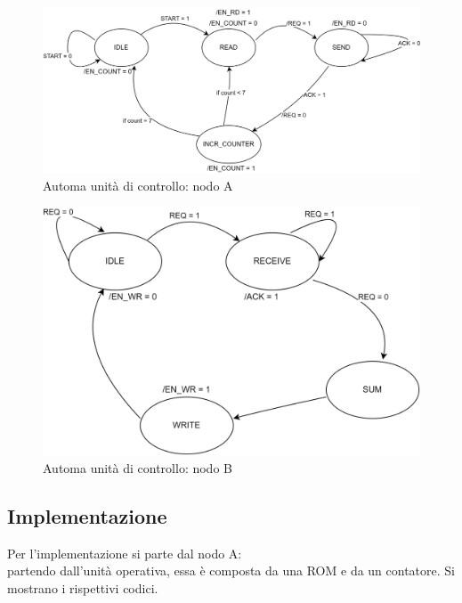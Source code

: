 \begin{figure}[H]
	\centering
	\includegraphics[width=1\textwidth]{img/preappDicembre/Preapp_automaA}
	\caption{Automa unità di controllo: nodo A}
	\label{wf_preapp} 
\end{figure}
\begin{figure}[H]
	\centering
	\includegraphics[width=1\textwidth]{img/preappDicembre/Preapp_automaB}
	\caption{Automa unità di controllo: nodo B}
	\label{wf_preapp} 
\end{figure}
\subsection{Implementazione}
Per l'implementazione si parte dal nodo A: \\
partendo dall'unità operativa, essa è composta da una ROM e da un contatore. Si mostrano i rispettivi codici.
\begin{code}
    \inputminted[frame=lines, framesep=2mm, baselinestretch=1.2, bgcolor=LightGray, fontsize=\footnotesize, linenos]{vhdl}{vhdl_files/preappDicembre/ROM.vhd}
    \caption{ROM.vhdl}
    \label{lst:mux_2_1}
\end{code}

